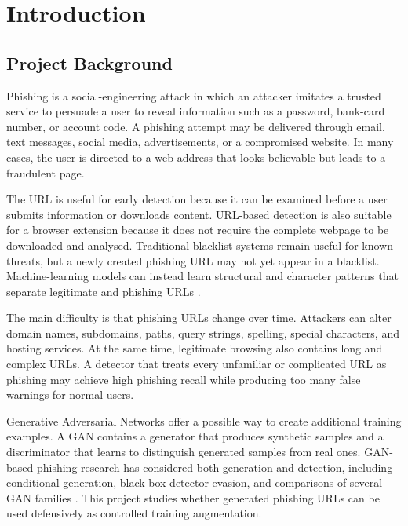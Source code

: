 \chapter{Introduction}
\label{chapter:introduction}

\section{Project Background}

Phishing is a social-engineering attack in which an attacker imitates a trusted
service to persuade a user to reveal information such as a password, bank-card
number, or account code. A phishing attempt may be delivered through email,
text messages, social media, advertisements, or a compromised website. In many
cases, the user is directed to a web address that looks believable but leads to
a fraudulent page.

The URL is useful for early detection because it can be examined before a user
submits information or downloads content. URL-based detection is also suitable
for a browser extension because it does not require the complete webpage to be
downloaded and analysed. Traditional blacklist systems remain useful for known
threats, but a newly created phishing URL may not yet appear in a blacklist.
Machine-learning models can instead learn structural and character patterns
that separate legitimate and phishing URLs \citep{sahingoz2019machine,
kamran2022conditional}.

The main difficulty is that phishing URLs change over time. Attackers can alter
domain names, subdomains, paths, query strings, spelling, special characters,
and hosting services. At the same time, legitimate browsing also contains long
and complex URLs. A detector that treats every unfamiliar or complicated URL as
phishing may achieve high phishing recall while producing too many false
warnings for normal users.

Generative Adversarial Networks offer a possible way to create additional
training examples. A GAN contains a generator that produces synthetic samples
and a discriminator that learns to distinguish generated samples from real
ones. GAN-based phishing research has considered both generation and detection,
including conditional generation, black-box detector evasion, and comparisons
of several GAN families \citep{kamran2022conditional,bac2021pwdgan,
pham2023evaluation}. This project studies whether generated phishing URLs can
be used defensively as controlled training augmentation.

